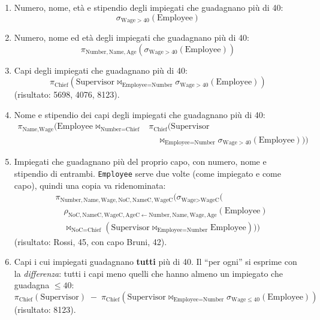 \documentclass[a4paper,12pt]{article}
\begin{document}
\begin{enumerate}
  \item Numero, nome, età e stipendio degli impiegati che guadagnano più di 40:
    \[ \sigma_{\text{Wage} > 40}(\text{Employee}) \]
  \item Numero, nome ed età degli impiegati che guadagnano più di 40:
    \[ \pi_{\text{Number},\text{Name},\text{Age}}
       (\sigma_{\text{Wage} > 40}(\text{Employee})) \]
  \item Capi degli impiegati che guadagnano più di 40:
    \[ \pi_{\text{Chief}}(\text{Supervisor}
       \bowtie_{\text{Employee} = \text{Number}}
       \sigma_{\text{Wage} > 40}(\text{Employee})) \]
    (risultato: 5698, 4076, 8123).
  \item Nome e stipendio dei capi degli impiegati che guadagnano più di 40:
    \begin{align*}
      \pi_{\text{Name},\text{Wage}}\bigl(\text{Employee}
        \bowtie_{\text{Number} = \text{Chief}}{}
      & \pi_{\text{Chief}}(\text{Supervisor}\\
      & \quad \bowtie_{\text{Employee} = \text{Number}}
        \sigma_{\text{Wage} > 40}(\text{Employee}))\bigr)
    \end{align*}
  \item Impiegati che guadagnano più del proprio capo, con numero, nome e
    stipendio di entrambi. \texttt{Employee} serve due volte (come impiegato e
    come capo), quindi una copia va ridenominata:
    \begin{align*}
      & \pi_{\text{Number},\text{Name},\text{Wage},\text{NoC},\text{NameC},
        \text{WageC}}\bigl(
        \sigma_{\text{Wage} > \text{WageC}}\bigl(\\
      & \quad \rho_{\text{NoC},\text{NameC},\text{WageC},\text{AgeC} \leftarrow
          \text{Number},\text{Name},\text{Wage},\text{Age}}(\text{Employee})\\
      & \quad \bowtie_{\text{NoC} = \text{Chief}}
        (\text{Supervisor} \bowtie_{\text{Employee} = \text{Number}}
         \text{Employee})\bigr)\bigr)
    \end{align*}
    (risultato: Rossi, 45, con capo Bruni, 42).
  \item Capi i cui impiegati guadagnano \textbf{tutti} più di 40. Il ``per
    ogni'' si esprime con la \emph{differenza}: tutti i capi meno quelli che
    hanno almeno un impiegato che guadagna $\leq 40$:
    \[ \pi_{\text{Chief}}(\text{Supervisor}) \;-\;
       \pi_{\text{Chief}}(\text{Supervisor}
       \bowtie_{\text{Employee} = \text{Number}}
       \sigma_{\text{Wage} \leq 40}(\text{Employee})) \]
    (risultato: 8123).
\end{enumerate}
\end{document}
